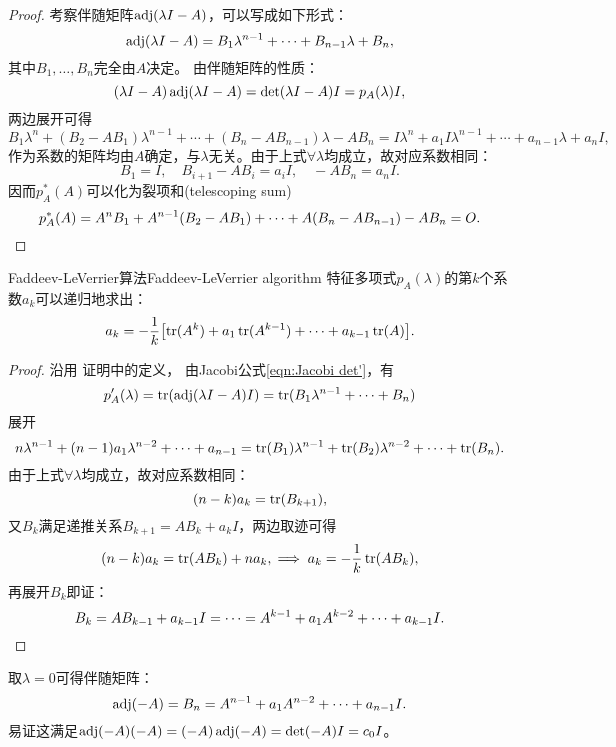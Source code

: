 
\begin{proof}
	考察伴随矩阵$\operatorname{adj}(\lambda I-A)$，可以写成如下形式：
	\[
		\operatorname{adj}(\lambda I-A)=B_1\lambda^{n-1}+\cdots+B_{n-1}\lambda+B_n,
	\]
	其中$B_1,\ldots,B_n$完全由$A$决定。
	由伴随矩阵的性质：
	\[
		(\lambda I-A)\operatorname{adj}(\lambda I-A)=\det(\lambda I-A)I=p_A(\lambda)I,
	\]
	两边展开可得
	\[
		B_1\lambda^n+(B_2-AB_1)\lambda^{n-1}+\cdots+(B_n-AB_{n-1})\lambda-AB_n=I\lambda^n+a_1I\lambda^{n-1}+\cdots+a_{n-1}\lambda+a_nI,
	\]
	作为系数的矩阵均由$A$确定，与$\lambda$无关。由于上式$\forall\lambda$均成立，故对应系数相同：
	\[
		B_1=I,\quad
		B_{i+1}-AB_i=a_iI,\quad
		-AB_n=a_nI.
	\]
	因而$p_A^*(A)$可以化为裂项和(telescoping sum)
	\[
		p_A^*(A)=A^nB_1+A^{n-1}(B_2-AB_1)+\cdots+A(B_n-AB_{n-1})-AB_n=O.
		\qedhere
	\]
\end{proof}

\begin{theorem}
	{Faddeev-LeVerrier算法}{Faddeev-LeVerrier algorithm}
	特征多项式$p_A(\lambda)$的第$k$个系数$a_k$可以递归地求出：
	\begin{equation}
		a_k=-\frac1k\bigl[\operatorname{tr}(A^k)+a_1\operatorname{tr}(A^{k-1})+\cdots+a_{k-1}\operatorname{tr}(A)\bigr].
	\end{equation}
\end{theorem}

\begin{proof}
	沿用 证明中的定义，
	由Jacobi公式\eqref{eqn:Jacobi det'}，有 
	\[
		p_A'(\lambda)=\operatorname{tr}(\operatorname{adj}(\lambda I-A)I)=\operatorname{tr}(B_1\lambda^{n-1}+\cdots+B_n)
	\]
	展开
	\[
		n\lambda^{n-1}+(n-1)a_1\lambda^{n-2}+\cdots+a_{n-1}=\operatorname{tr}(B_1)\lambda^{n-1}+\operatorname{tr}(B_2)\lambda^{n-2}+\cdots+\operatorname{tr}(B_n).
	\]
	由于上式$\forall\lambda$均成立，故对应系数相同：
	\[
		(n-k)a_k=\operatorname{tr}(B_{k+1}),
	\]
	又$B_k$满足递推关系$B_{k+1}=AB_k+a_kI$，两边取迹可得
	\[
		(n-k)a_k=\operatorname{tr}(AB_k)+na_k,\implies a_k=-\frac1k\operatorname{tr}(AB_k),
	\]
	再展开$B_k$即证：
	\[
		B_k=AB_{k-1}+a_{k-1}I=\cdots=A^{k-1}+a_1A^{k-2}+\cdots+a_{k-1}I.
		\qedhere
	\]
\end{proof}

\begin{corollary}
	取$\lambda=0$可得伴随矩阵：
	\begin{equation}
		\operatorname{adj}(-A)=B_n=A^{n-1}+a_1A^{n-2}+\cdots+a_{n-1}I.
	\end{equation}
	易证这满足$\operatorname{adj}(-A)(-A)=(-A)\operatorname{adj}(-A)=\det(-A)I=c_0I$。
\end{corollary}

